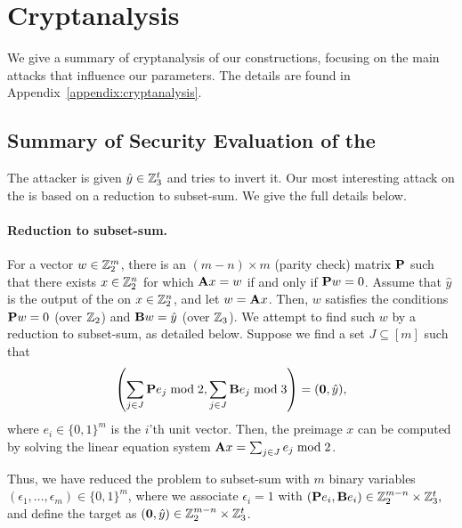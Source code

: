 \section{Cryptanalysis}
\label{sec:cryptanalysis}

We give a summary of cryptanalysis of our constructions,
focusing on the main attacks that influence our parameters.
The details are found in Appendix~\ref{appendix:cryptanalysis}.


\subsection{Summary of Security Evaluation of the \ttOWF}

The attacker is given $\hat{y} \in \mathbb{Z}_3^t$ and tries to invert it.
Our most interesting attack on the \ttOWF is based on a reduction to subset-sum.
We give the full details below.

\paragraph{Reduction to subset-sum.}
For a vector $w \in \mathbb{Z}_2^m$, there is an $(m -n) \times m$ (parity check) matrix $\mat{P}$ such that there exists $x \in \mathbb{Z}_2^n$ for which $\mat{A}x = w$ if and only if $\mat{P} w=0$.
Assume that $\hat{y}$ is the output of the \ttOWF on $x \in \mathbb{Z}_2^n$, and let $w = \mat{A}x$. Then,
$w$ satisfies the conditions $\mat{P} w = 0$ (over $\mathbb{Z}_2$) and $\mat{B}w = \hat{y}$ (over $\mathbb{Z}_3$).
We attempt to find such $w$ by a reduction to subset-sum, as detailed below. Suppose we find a set $J \subseteq [m]$ such that
$$\left( \sum_{j \in J} \mat{P}e_j  \bmod 2, \sum_{j \in J} \mat{B}e_j  \bmod 3 \right) = (\vec{0},\hat{y}),$$
where $e_i \in \{0,1\}^m$ is the $i$'th unit vector.
Then, the preimage $x$ can be computed by solving the linear equation system
$\mat{A}x = \sum_{j \in J} e_j  \bmod 2$.

Thus, we have reduced the problem to subset-sum with $m$ binary variables
$(\epsilon_1, \ldots, \epsilon_m) \in \{0,1\}^m$, where we associate $\epsilon_i = 1$
with $(\mat{P}e_i, \mat{B}e_i) \in \Z_2^{m-n} \times \Z_3^t,$
and define the target
as $(\vec{0},\hat{y}) \in \Z_2^{m-n} \times \Z_3^t$.

